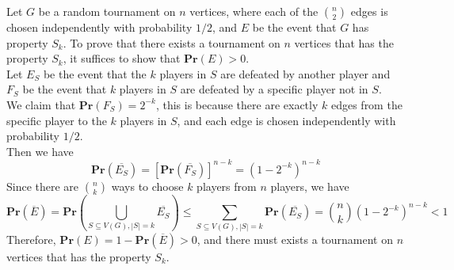 \documentclass[a4paper, justified]{tufte-handout}
\begin{document}
\begin{solution}
  Let \( G \) be a random tournament on \( n \) vertices, where each of the \( \binom{n}{2} \) edges is chosen independently with probability \( 1/2 \), and $E$ be the event that \( G \) has property \( S_k \). To prove that there exists a tournament on \( n \) vertices that has the property \( S_k \), it suffices to show that \( \mathbf{Pr}(E) > 0 \).\\
  Let \( E_S \) be the event that the \( k \) players in \( S \) are defeated by another player and \( F_S \) be the event that \( k \) players in \( S \) are defeated by a specific player not in $S$. \\
  We claim that $\mathbf{Pr}(F_S) = 2^{-k}$, this is because there are exactly \(k\) edges from the specific player to the \(k\) players in \(S\), and each edge is chosen independently with probability \(1/2\).\\
  Then we have
  \[ \mathbf{Pr}(\overline{E_S}) = \left[\mathbf{Pr}(\overline{F_S})\right]^{n-k} = \left(1-2^{-k}\right)^{n-k} \]
  Since there are \( \binom{n}{k} \) ways to choose \( k \) players from \( n \) players, we have
  \[\mathbf{Pr}(\overline{E}) = \mathbf{Pr}(\bigcup_{S \subseteq V(G), |S| = k}\overline{E_S}) \leq \sum_{S\subseteq V(G), |S| = k} \mathbf{Pr}(\overline{E_S}) = \binom{n}{k}\left(1-2^{-k}\right)^{n-k}<1 \]
  Therefore, $\mathbf{Pr}(E) = 1 - \mathbf{Pr}(\overline{E}) > 0$, and there must exists a tournament on $n$ vertices that has the property $S_k$. 
\end{solution}

\end{document}
